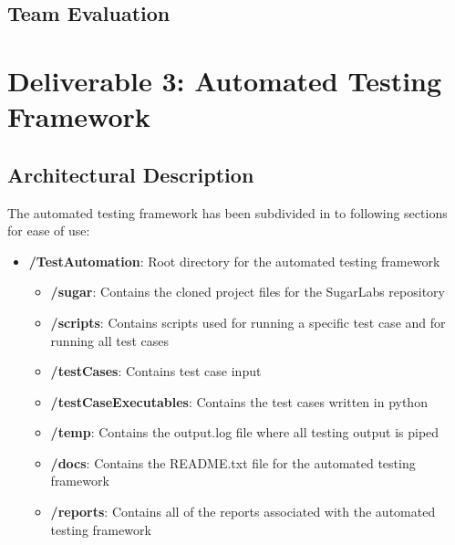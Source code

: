 \documentclass{article}
\begin{document}
\subsection{Team Evaluation}

\section{Deliverable 3: Automated Testing Framework}
\subsection{Architectural Description}
The automated testing framework has been subdivided in to following sections for ease of use:
\begin{itemize}[noitemsep,topsep=0pt]
\item[]\textbf{/TestAutomation}: Root directory for the automated testing framework
\begin{itemize}[noitemsep,topsep=0pt]
\item[]\textbf{/sugar}: Contains the cloned project files for the SugarLabs repository
\item[]\textbf{/scripts}: Contains scripts used for running a specific test case and for running all test cases
\item[]\textbf{/testCases}: Contains test case input
\item[]\textbf{/testCaseExecutables}: Contains the test cases written in python
\item[]\textbf{/temp}: Contains the output.log file where all testing output is piped
\item[]\textbf{/docs}: Contains the README.txt file for the automated testing framework
\item[]\textbf{/reports}: Contains all of the reports associated with the automated testing framework
\end{itemize}
\end{itemize}
\end{document}
